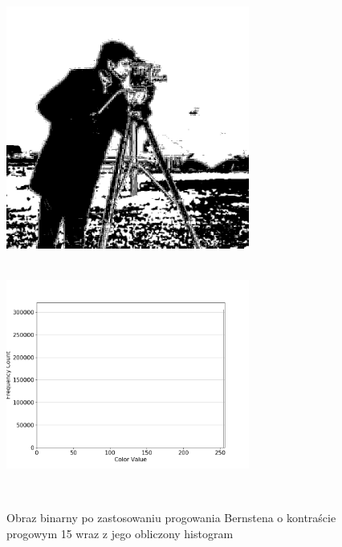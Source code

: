 \documentclass[a4paper,12pt]{book}
\begin{document}
\begin{figure}[H]
	\caption{Obraz binarny po zastosowaniu progowania Bernstena o kontraście progowym 15 wraz z jego obliczony histogram}
	\includegraphics[width=8cm, height=8cm]{5-4/local-threshold-image-photoman-15.png}
	\includegraphics[width=8cm, height=8cm]{5-4/local-threshold-photoman-15.png}
\end{figure}
\end{document}
